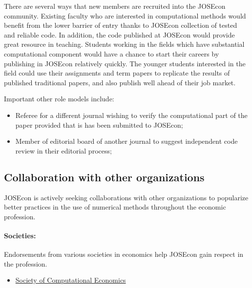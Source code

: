 There are several ways that new members are recruited into the JOSEcon community.  
Existing faculty who are interested in computational methods would benefit from the lower 
barrier of entry thanks to JOSEcon collection of tested and reliable code.
In addition, the code published at JOSEcon would provide great resource in teaching.
Students working in the fields which have substantial computational component would
have a chance to start their careers by publishing in JOSEcon relatively quickly.
The younger students interested in the field could use their assignments and term papers
to replicate the results of published traditional papers, and also publish well
ahead of their job market.

Important other role models include:
\begin{itemize}
\item Referee for a different journal wishing to verify the computational part of 
the paper provided that is has been submitted to JOSEcon;
\item Member of editorial board of another journal to suggest independent code review 
in their editorial process;
\end{itemize}  


\subsection{Collaboration with other organizations}

JOSEcon is actively seeking collaborations with other organizations to popularize 
better practices in the use of numerical methods throughout the economic profession.

\paragraph{Societies:} 
Endorsements from various societies in economics help JOSEcon
gain respect in the profession.
\begin{itemize}
\item \href{https://comp-econ.org/}{Society of Computational Economics}
\end{itemize}


